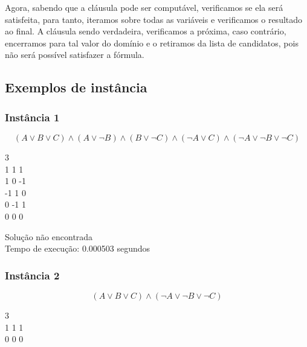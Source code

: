 \documentclass[12pt]{article}
\begin{document}
    \par Agora, sabendo que a cláusula pode ser computável, verificamos se ela será satisfeita, para tanto, iteramos sobre todas as variáveis e verificamos o resultado ao final. A cláusula sendo verdadeira, verificamos a próxima, caso contrário, encerramos para tal valor do domínio e o retiramos da lista de candidatos, pois não será possível satisfazer a fórmula. 

    \subsection{Exemplos de instância}
    \subsubsection{Instância 1}
        \[(A \lor B \lor C) \land (A \lor \neg B) \land (B \lor \neg C) \land (\neg A \lor C) \land (\neg A \lor \neg B \lor \neg C)\]
        \begin{tcolorbox}[title=Entrada da instância 1, width=\linewidth, 
          fontupper=\ttfamily, 
          halign=flush left]
            3 \\ 
            1 1 1 \\
            1 0 -1 \\
            -1 1 0 \\
            0 -1 1 \\
            0 0 0 \\
        \end{tcolorbox}
        
        \begin{tcolorbox}[title=Saída da instância 1, width=\linewidth, fontupper=\ttfamily, halign=flush left]
            Solução não encontrada \\
            Tempo de execução: 0.000503 segundos \\  
        \end{tcolorbox}
    \subsubsection{Instância 2}
        \[(A \lor B \lor C) \land (\neg A \lor \neg B \lor \neg C)\]
        \begin{tcolorbox}[title=Entrada da instância 2, width=\linewidth, 
          fontupper=\ttfamily, 
          halign=flush left]
            3 \\
            1 1 1 \\
            0 0 0 \\
        \end{tcolorbox}
        
\end{document}
